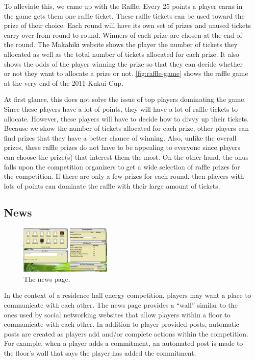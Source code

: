 To alleviate this, we came up with the Raffle.  Every 25 points a player earns in the game gets them one raffle ticket.  These raffle tickets can be used toward the prize of their choice.  Each round will have its own set of prizes and unused tickets carry over from round to round.  Winners of each prize are chosen at the end of the round.  The Makahiki website shows the player the number of tickets they allocated as well as the total number of tickets allocated for each prize.  It also shows the odds of the player winning the prize so that they can decide whether or not they want to allocate a prize or not. \autoref{fig:raffle-game} shows the raffle game at the very end of the 2011 Kukui Cup.

At first glance, this does not solve the issue of top players dominating the game.  Since these players have a lot of points, they will have a lot of raffle tickets to allocate.  However, these players will have to decide how to divvy up their tickets.  Because we show the number of tickets allocated for each prize, other players can find prizes that they have a better chance of winning.  Also, unlike the overall prizes, these raffle prizes do not have to be appealing to everyone since players can choose the prize(s) that interest them the most. On the other hand, the onus falls upon the competition organizers to get a wide selection of raffle prizes for the competition.  If there are only a few prizes for each round, then players with lots of points can dominate the raffle with their large amount of tickets.

\subsection{News}
\label{makahiki:pages-news}

\begin{figure}[h]
  \center
  \includegraphics[width=0.4\textwidth]{images/news.eps}
  \caption{The news page.}
  \label{fig:news-prod}
\end{figure}

In the context of a residence hall energy competition, players may want a place to communicate with each other. The news page provides a ``wall'' similar to the ones used by social networking websites that allow players within a floor to communicate with each other. In addition to player-provided posts, automatic posts are created as players add and/or complete actions within the competition. For example, when a player adds a commitment, an automated post is made to the floor's wall that says the player has added the commitment.

